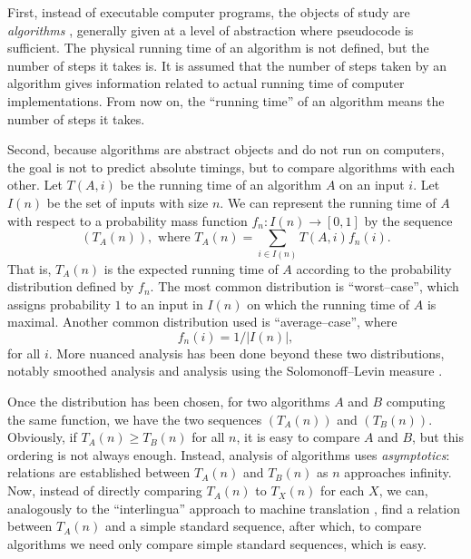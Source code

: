 \documentclass{article}
\theoremstyle{plain}
\begin{document}
First, instead of executable computer programs, the objects of study are
\emph{algorithms} \cite{guralg},
generally given at a level of abstraction where pseudocode
is sufficient.
The physical running time of an algorithm is not defined, but the number
of steps it takes is.
It is assumed that the number of steps taken by an algorithm gives information
related to actual running time of computer implementations.
From now on, the ``running time'' of an algorithm means the number of steps
it takes.

Second, because algorithms are abstract objects and do not run on computers,
the goal is not to predict absolute timings, but to compare algorithms
with each other.
Let \( T(A, i) \) be the running time of an algorithm \( A \) on an input
\( i \).
Let \( I(n) \) be the set of inputs with size \( n \).
We can represent the running time of \( A \) with respect to a probability
mass function \( f_n : I(n) \rightarrow [0, 1] \) by the sequence
\[
  (T_A(n)), \text{ where } T_A(n) = \sum_{ i \in I(n) } T(A, i) f_n(i).
\]
That is, \( T_A(n) \) is the expected running time of \( A \) according to the
probability distribution defined by \(f_n\).
The most common distribution is ``worst--case'', which assigns probability
\( 1 \) to an input in \( I(n) \) on which the running time of \( A \) is
maximal.
Another common distribution used is ``average--case'', where
\[
  f_n(i) = 1 / |I(n)|,
\]
for all \( i \).
More nuanced analysis has been done beyond these two distributions,
notably smoothed analysis and analysis using the Solomonoff--Levin measure
\cite{livit}.

Once the distribution has been chosen, for two algorithms \(A\) and \(B\)
computing the same
function, we have the two sequences \( (T_A(n)) \) and \( (T_B(n)) \).
Obviously, if \( T_A(n) \geq T_B(n) \) for all \(n\), it is easy to compare
\(A\) and \(B\), but this ordering is not always enough.
Instead, analysis of algorithms uses \emph{asymptotics}:
relations are established between \( T_A(n) \) and \( T_B(n) \) as \( n \)
approaches infinity.
Now, instead of directly comparing \(T_A(n) \) to \(T_X(n) \) for each \( X \),
we can, analogously to  the ``interlingua'' approach to machine translation
\cite{jurafsky2000speech},
find a relation between \(T_A(n) \) and a simple standard sequence, after
which, to compare algorithms we need only compare simple standard sequences,
which is easy.
\end{document}
